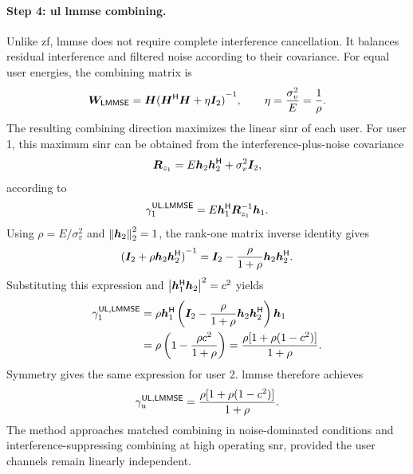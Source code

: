 \paragraph{Step 4: \ac{ul} \ac{lmmse} combining.}
Unlike \ac{zf}, \ac{lmmse} does not require complete interference cancellation. It balances residual interference and filtered noise according to their covariance. For equal user energies, the combining matrix is
\begin{equation*}
	\bm{W}_{\mathsf{LMMSE}}
	=\bm{H}{({\bm{H}}^{\mathsf{H}}\bm{H}+\eta\bm{I}_2)}^{-1},
	\qquad
	\eta=\frac{\sigma_v^2}{E}=\frac1\rho.
\end{equation*}
The resulting combining direction maximizes the linear \ac{sinr} of each user. For user 1, this maximum \ac{sinr} can be obtained from the interference-plus-noise covariance
\begin{equation*}
	\bm{R}_{z_1}=E\bm{h}_2{\bm{h}}^{\mathsf{H}}_2+\sigma_v^2\bm{I}_2,
\end{equation*}
according to
\begin{equation*}
	\gamma_1^{\mathsf{UL},\mathsf{LMMSE}}
	=E{\bm{h}}^{\mathsf{H}}_1{\bm{R}}^{-1}_{z_1}\bm{h}_1.
\end{equation*}
Using $\rho=E/\sigma_v^2$ and $\left\|\bm{h}_2\right\|_2^2=1$, the rank-one matrix inverse identity gives
\begin{equation*}
	{(\bm{I}_2+\rho\bm{h}_2{\bm{h}}^{\mathsf{H}}_2)}^{-1}
	=\bm{I}_2-\frac{\rho}{1+\rho}\bm{h}_2{\bm{h}}^{\mathsf{H}}_2.
\end{equation*}
Substituting this expression and $\left|{\bm{h}}^{\mathsf{H}}_1\bm{h}_2\right|^2=c^2$ yields
\begin{equation*}
	\begin{split}
		\gamma_1^{\mathsf{UL},\mathsf{LMMSE}}
		&=\rho{\bm{h}}^{\mathsf{H}}_1
		\left(\bm{I}_2-\frac{\rho}{1+\rho}\bm{h}_2{\bm{h}}^{\mathsf{H}}_2\right)\bm{h}_1\\
		&=\rho\left(1-\frac{\rho c^2}{1+\rho}\right)
		=\frac{\rho[1+\rho(1-c^2)]}{1+\rho}.
	\end{split}
\end{equation*}
Symmetry gives the same expression for user 2. \ac{lmmse} therefore achieves
\begin{equation}
	\gamma_u^{\mathsf{UL},\mathsf{LMMSE}}
	=\frac{\rho[1+\rho(1-c^2)]}{1+\rho}.
	\label{eq06:mu-lmmse}
\end{equation}
The method approaches matched combining in noise-dominated conditions and interference-suppressing combining at high operating \ac{snr}, provided the user channels remain linearly independent.

